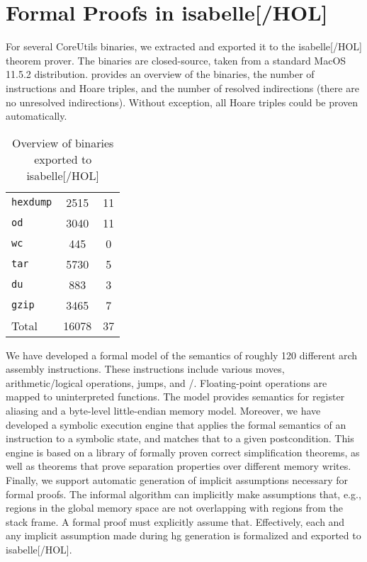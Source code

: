\section{Formal Proofs in \gls{isabelle}[/HOL]}\label{sec:not-me-proofs}
For several CoreUtils binaries, we extracted  and exported it to the \gls{isabelle}[/HOL] theorem prover.
The binaries are closed-source, taken from a standard MacOS 11.5.2 distribution.
 provides an overview of the binaries, the number of instructions and Hoare triples, and the number of resolved indirections (there are no unresolved indirections).
Without exception, all Hoare triples could be proven automatically.

\begin{table}
  \centering
  \caption{Overview of binaries exported to \gls{isabelle}[/HOL]}
  \label{tab:isa}
  \begin{tabular}{lSS}
    \toprule
     & {} & {}\\
    \midrule
    \texttt{hexdump} & 2515 & 11 \\
    \texttt{od}      & 3040 & 11 \\
    \texttt{wc}      &  445 &  0 \\
    \texttt{tar}     & 5730 & 5 \\
    \texttt{du}      &  883 & 3\\
    \texttt{gzip}    & 3465 & 7\\
    \midrule
    Total            & 16078 & 37 \\
    \bottomrule
  \end{tabular}
\end{table}

We have developed a formal model of the semantics of roughly \num{120} different \gls{arch} assembly instructions.
These instructions include various moves, arithmetic/logical operations, jumps, and /.
Floating-point operations are mapped to uninterpreted functions.
The model provides semantics for register aliasing and a byte-level little-endian memory model.
Moreover, we have developed a symbolic execution engine that applies the formal semantics of an instruction to a symbolic state, and matches that to a given postcondition.
This engine is based on a library of formally proven correct simplification theorems, as well as theorems that prove separation properties over different memory writes.
Finally, we support automatic generation of implicit assumptions necessary for formal proofs.
The informal algorithm can implicitly make assumptions that, e.g., regions in the global memory space are not overlapping with regions from the stack frame.
A formal proof must explicitly assume that.
Effectively, each and any implicit assumption made during \ac{hg} generation is formalized and exported to \gls{isabelle}[/HOL].

